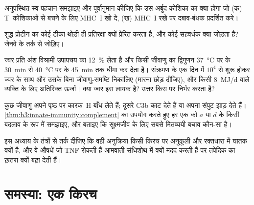 \begin{exercise}[$\star\star$]\label{exo:b3:innate-immunity:8}
अनुपस्थित-स्व पहचान समझाइए और पूर्वानुमान कीजिए कि उस अर्बुद-कोशिका का
क्या होगा जो (क) T~कोशिकाओं से बचने के लिए MHC~I खो दे, (ख) MHC~I
रखे पर दबाव-बंधक प्रदर्शित करे।
\end{exercise}

\begin{exercise}[$\star\star$]\label{exo:b3:innate-immunity:9}
शुद्ध प्रोटीन का कोई टीका थोड़ी ही प्रतिरक्षा क्यों प्रेरित करता है,
और कोई सहवर्धक क्या जोड़ता है? जेनवे के तर्क से जोड़िए।
\end{exercise}

\begin{exercise}[$\star\star\star$]\label{exo:b3:innate-immunity:10}
ज्वर प्रति अंश विश्रामी उपापचय का \qty{12}{\%} लेता है और किसी जीवाणु
का द्विगुणन \qty{37}{\celsius} पर के \qty{30}{min} से \qty{40}{\celsius}
पर के \qty{45}{min} तक धीमा कर देता है। संक्रमण के एक दिन में
$10^{4}$ से शुरू होकर ज्वर के साथ और उसके बिना जीवाणु-समष्टि निकालिए
(मारना छोड़ दीजिए), और किसी \qty{8}{MJ/d} वाले व्यक्ति के लिए अतिरिक्त
ऊर्जा। क्या ज्वर इस लायक है? उत्तर किस पर निर्भर करता है?
\end{exercise}

\begin{exercise}[$\star\star\star$]\label{exo:b3:innate-immunity:11}
कुछ जीवाणु अपने पृष्ठ पर कारक~H बाँध लेते हैं; दूसरे C3b काट देते हैं
या अपना संपुट झाड़ देते हैं। \cref{thm:b3:innate-immunity:complement}
का उपयोग करते हुए हर एक को $a$ या $d$ के किसी बदलाव के रूप में समझाइए,
और बताइए कि सूक्ष्मजीव के लिए सबसे मितव्ययी बचाव कौन-सा है।
\end{exercise}

\begin{exercise}[$\star\star\star$]\label{exo:b3:innate-immunity:12}
इस अध्याय के तंत्रों से तर्क दीजिए कि वही अनुक्रिया किसी किरच पर
अनुकूली और रक्तधारा में घातक क्यों है, और वे औषधें जो TNF रोकती हैं
आमवाती संधिशोथ में क्यों मदद करती हैं पर तपेदिक का ख़तरा क्यों बढ़ा
देती हैं।
\end{exercise}

\section{समस्या: एक किरच}

